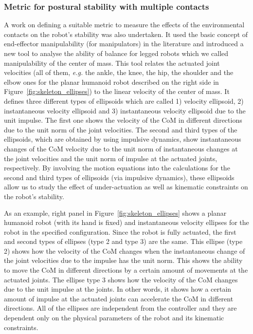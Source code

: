 \documentclass[final,5p,twocolumn]{elsarticle}
\begin{document}
\subsubsection{Metric for postural stability with multiple contacts}
 A work on defining a suitable metric to measure the effects of the environmental contacts on the robot's stability was also undertaken.
It used the basic concept of end-effector manipulability (for manipulators)
in the literature and introduced a new tool to analyse the ability of balance
for legged robots which we called manipulability of the center of mass.
This tool relates the actuated joint velocities (all of them, \textit{e.g.} the ankle, the knee, the hip, the shoulder and the elbow ones for the planar humanoid robot described on the right side in Figure~\ref{fig:skeleton_ellipses}) to the linear velocity of the center of mass. It defines three different types of ellipsoids which are called 1)
velocity ellipsoid, 2) instantaneous velocity ellipsoid and 3) instantaneous
velocity ellipsoid due to the unit impulse.  The first one shows the velocity
of the CoM in different directions due to the unit norm of the joint
velocities.  The second and third types of the ellipsoids, which are obtained
by using impulsive dynamics, show instantaneous changes of the CoM velocity
due to the unit norm of instantaneous changes at the joint velocities and the
unit norm of impulse at the actuated joints, respectively.  By involving the
motion equations into the calculations for the second and third types of
ellipsoids (via impulsive dynamics), these ellipsoids allow us to study the
effect of under-actuation as well as kinematic constraints on the robot's
stability.

As an example, right panel in Figure~\ref{fig:skeleton_ellipses} shows a planar humanoid robot (with its hand is fixed) and instantaneous velocity ellipses for the robot in the specified configuration. Since the robot is fully actuated, the first and
second types of ellipses (type 2 and type 3) are the same. This ellipse (type
2) shows how the velocity of the CoM changes when the instantaneous change of
the joint velocities due to the impulse has the unit norm. This shows the
ability to move the CoM in different directions by a certain amount of
movements at the actuated joints. The ellipse type 3 shows how the velocity
of the CoM changes due to the unit impulse at the joints. In other words, it
shows how a certain amount of impulse at the actuated joints can accelerate
the CoM in different directions. All of the ellipses are independent from the
controller and they are dependent only on the physical parameters of the robot
and its kinematic constraints.
\end{document}
